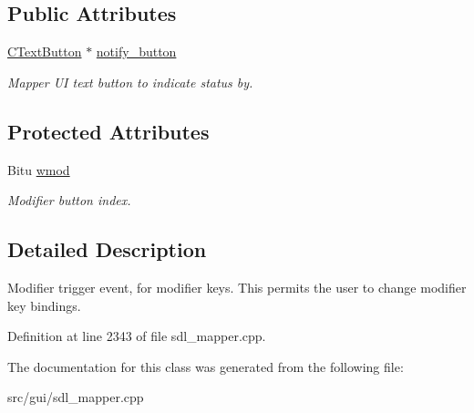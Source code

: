 \subsection*{Public Attributes}
\begin{DoxyCompactItemize}
\item 
\hypertarget{classCModEvent_aa5dc746da9ec638e1959bfd1dddafc75}{\hyperlink{classCTextButton}{C\-Text\-Button} $\ast$ \hyperlink{classCModEvent_aa5dc746da9ec638e1959bfd1dddafc75}{notify\-\_\-button}}\label{classCModEvent_aa5dc746da9ec638e1959bfd1dddafc75}

\begin{DoxyCompactList}\small\item\em Mapper U\-I text button to indicate status by. \end{DoxyCompactList}\end{DoxyCompactItemize}
\subsection*{Protected Attributes}
\begin{DoxyCompactItemize}
\item 
\hypertarget{classCModEvent_a54a25228b8da694c33c44e4b161defd9}{Bitu \hyperlink{classCModEvent_a54a25228b8da694c33c44e4b161defd9}{wmod}}\label{classCModEvent_a54a25228b8da694c33c44e4b161defd9}

\begin{DoxyCompactList}\small\item\em Modifier button index. \end{DoxyCompactList}\end{DoxyCompactItemize}


\subsection{Detailed Description}
Modifier trigger event, for modifier keys. This permits the user to change modifier key bindings. 

Definition at line 2343 of file sdl\-\_\-mapper.\-cpp.



The documentation for this class was generated from the following file\-:\begin{DoxyCompactItemize}
\item 
src/gui/sdl\-\_\-mapper.\-cpp\end{DoxyCompactItemize}
